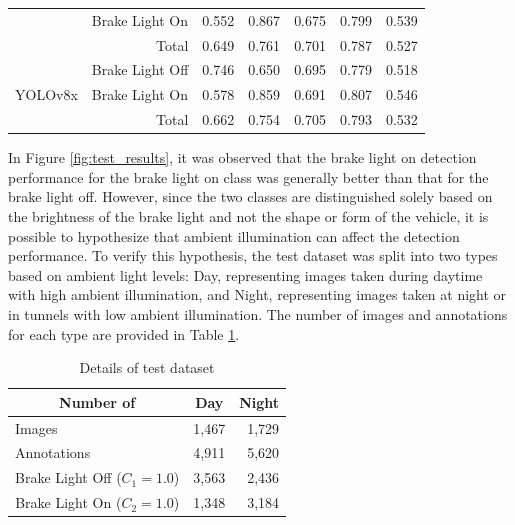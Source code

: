 \begin{table}[!h]
\begin{tabular}{llrrrrr}
                              & Brake Light On            & 0.552 & 0.867 & 0.675 & 0.799                     & 0.539                        \\
                              & \multicolumn{1}{r}{Total} & 0.649 & 0.761 & 0.701 & 0.787                     & 0.527                      \\
    \midrule
    \multirow{3}{*}{YOLOv8x}  & Brake Light Off           & 0.746 & 0.650 & 0.695 & 0.779                     & 0.518                         \\
                              & Brake Light On            & 0.578 & 0.859 & 0.691 & 0.807                     & 0.546                        \\
                              & \multicolumn{1}{r}{Total} & 0.662 & 0.754 & 0.705 & 0.793                     & 0.532                      \\
    \bottomrule
    \end{tabular}%
\end{table}


In Figure \ref{fig:test_results}, it was observed that the brake light on detection performance for the brake light on class was generally better than that for the brake light off.
However, since the two classes are distinguished solely based on the brightness of the brake light and not the shape or form of the vehicle, it is possible to hypothesize that ambient illumination can affect the detection performance. 
To verify this hypothesis, the test dataset was split into two types based on ambient light levels: Day, representing images taken during daytime with high ambient illumination, and Night, representing images taken at night or in tunnels with low ambient illumination.
The number of images and annotations for each type are provided in Table \ref{tab:test_dataset}.

\begin{table}[h]
    \caption{Details of test dataset}
    \label{tab:test_dataset}
    \begin{tabular}{p{5cm} p{5cm} p{5cm}}
    \toprule
    \multicolumn{1}{c}{Number of}                          & \multicolumn{1}{c}{Day} & \multicolumn{1}{c}{Night} \\
    \midrule
    Images                              & \multicolumn{1}{r}{1,467}                     & \multicolumn{1}{r}{1,729}                    \\
    Annotations                         & \multicolumn{1}{r}{4,911}                    & \multicolumn{1}{r}{5,620}                   \\
    \multicolumn{1}{c}{Brake Light Off ($C_{1}=1.0$)} & \multicolumn{1}{r}{3,563}                    & \multicolumn{1}{r}{2,436}                    \\
    \multicolumn{1}{c}{Brake Light On ($C_{2}=1.0$)}  & \multicolumn{1}{r}{1,348}                     & \multicolumn{1}{r}{3,184}                   \\
    \bottomrule
    \end{tabular}%
\end{table}


